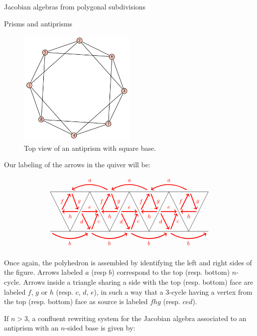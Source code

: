 \begin{chapter}{Jacobian algebras from polygonal subdivisions}
\begin{section}{Prisms and antiprisms}
\begin{figure}[h]
\centering
	\includegraphics[width=0.5\textwidth]{antiprism.png}
\caption{Top view of an antiprism with square base.}
\end{figure}

Our labeling of the arrows in the quiver will be:


\[
\begin{tikzpicture}[text width=1.5mm, font=\footnotesize]
\draw (-4, 0) -- (4, 0);
\draw (-4, 2) -- (4, 2);
\foreach \x in {-4,-2,...,2}
{
\draw (\x, 2) -- (\x+1, 0);
\draw (\x+1, 0) -- (\x+2, 2);
}
\foreach \x in {-3,-1,...,1}
{
\draw[<-, red, very thick] (\x+0.1, 2.1) to [bend left] node[above]{$a$} (\x+1.9, 2.1);
\draw[->, red, very thick] (\x+0.6, 1) to node[above]{$e$} (\x+1.4, 1);
\draw[->, red, very thick] (\x+0.6, 0.9) to node[left]{$d$} (\x+1, 0.1);
\draw[->, red, very thick] (\x+1.1, 0.1) to node[right]{$c$} (\x+1.4, 0.9);
}

\foreach \x in {-4,-2,...,2}
{
\draw[->, red, very thick] (\x+0.1, -0.1) to [bend right] node[below]{$b$} (\x+1.9, -0.1);
\draw[<-, red, very thick] (\x+0.6, 1) to node[below]{$h$} (\x+1.4, 1);
\draw[->, red, very thick] (\x+0.6, 1.1) to node[left]{$f$} (\x+1, 1.9);
\draw[->, red, very thick] (\x+1.1, 1.9) to node[right]{$g$} (\x+1.4, 1.1);
}
\end{tikzpicture}
\]

Once again, the polyhedron is assembled by identifying the left and right sides of the figure. Arrows labeled $a$ (resp $b$) correspond to the top (resp. bottom) $n$-cycle. Arrows inside a triangle sharing a side with the top (resp. bottom) face are labeled $f$, $g$ or $h$ (resp. $c$, $d$, $e$), in such a way that a 3-cycle having a vertex from the top (resp. bottom) face as source is labeled $fhg$ (resp. $ced$).

If $n>3$, a confluent rewriting system for the Jacobian algebra associated to an antiprism with an $n$-sided base is given by:


\end{section}
\end{chapter}

